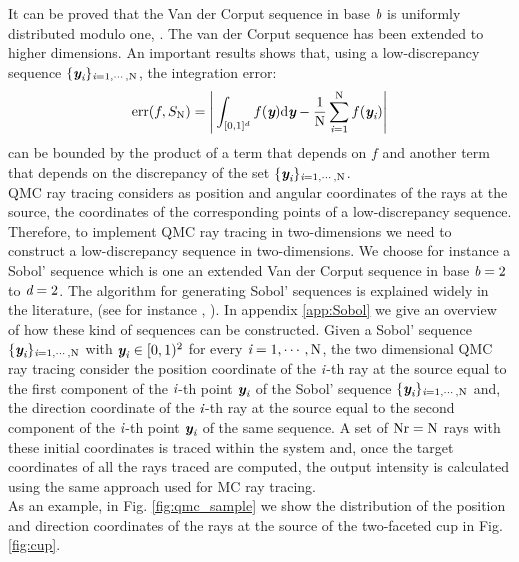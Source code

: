 It can be proved that the Van der Corput sequence in base $\textit{b}$ is uniformly distributed modulo one, \cite{leobacher2014introduction}. 
The van der Corput sequence has been extended to higher dimensions. An important results shows that, using a low-discrepancy sequence $\{\textit{\textbf{y}}_{\textit{i}}\}_{\textit{i}=1, \cdots, \textrm{N}}$, the integration error:
\begin{equation}
\textrm{err}(f, S_{\textrm{N}}) =\Bigg|\int_{[0,1]^d}f(\textit{\textbf{y}}) \textrm{d}\textit{\textbf{y}}-\frac{1}{\textrm{N}}\sum_{\textit{i}=1}^{\textrm{N}}f(\textit{\textbf{y}}_{\textit{i}})\Bigg|
\end{equation}
 can be bounded by the product of a term that depends on $f$ and another term that depends on the discrepancy of the set $\{\textit{\textbf{y}}_{\textit{i}}\}_{\textit{i}=1, \cdots, \textrm{N}}$.
\\ \indent QMC ray tracing considers as position and angular coordinates of the rays at the source, the coordinates of the corresponding points of a low-discrepancy sequence. 
Therefore, to implement QMC ray tracing in two-dimensions we need to construct a low-discrepancy sequence in two-dimensions. We choose for instance a Sobol' sequence which is one an extended Van der Corput sequence in base $\textit{b}=2$ to $\textit{d}=2$. The algorithm for generating Sobol' sequences is explained widely in the literature, (see for instance , \cite{bratley1988algorithm}). In appendix \ref{app:Sobol} we give an overview of how these kind of sequences can be constructed. 
Given a Sobol' sequence $\{\textit{\textbf{y}}_{\textit{i}}\}_{\textit{i}=1, \cdots, \textrm{N}}$ with $\textit{\textbf{y}}_{\textit{i}}\in[0,1)^2$ for every $\textit{i}=1, \cdots, \textrm{N}$, the two dimensional QMC ray tracing consider the position coordinate of the $\textit{i}$-th ray at the source equal to the first component of the $\textit{i}$-th point 
$\textit{\textbf{y}}_{\textit{i}}$ of the Sobol' sequence  $\{\textit{\textbf{y}}_{\textit{i}}\}_{\textit{i}=1, \cdots, \textrm{N}}$ and, the direction coordinate of the $\textit{i}$-th ray at the source equal to the second component of the $\textit{i}$-th point 
$\textit{\textbf{y}}_{\textit{i}}$ of the same sequence. A set of $\textrm{Nr} = \textrm{N}$ rays with these initial coordinates is traced within the system and, once the target coordinates of all the rays traced are computed, the output intensity is calculated using the same approach used for MC ray tracing.\\ \indent
As an example, in Fig. \ref{fig:qmc_sample} we show the distribution of the position and direction coordinates of the rays at the source of the two-faceted cup in Fig. \ref{fig:cup}. 
